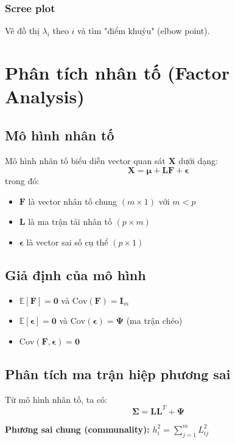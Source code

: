 \subsubsection*{Scree plot}
Vẽ đồ thị $\lambda_i$ theo $i$ và tìm "điểm khuỷu" (elbow point).

\section{Phân tích nhân tố (Factor Analysis)}

\subsection{Mô hình nhân tố}
\begin{dn}
Mô hình nhân tố biểu diễn vector quan sát $\mathbf{X}$ dưới dạng:
\[
\mathbf{X} = \boldsymbol{\mu} + \mathbf{L}\mathbf{F} + \boldsymbol{\epsilon}
\]
trong đó:
\begin{itemize}
    \item $\mathbf{F}$ là vector nhân tố chung $(m \times 1)$ với $m < p$
    \item $\mathbf{L}$ là ma trận tải nhân tố $(p \times m)$
    \item $\boldsymbol{\epsilon}$ là vector sai số cụ thể $(p \times 1)$
\end{itemize}
\end{dn}

\subsection{Giả định của mô hình}
\begin{itemize}
    \item $\mathbb{E}[\mathbf{F}] = \mathbf{0}$ và $\text{Cov}(\mathbf{F}) = \mathbf{I}_m$
    \item $\mathbb{E}[\boldsymbol{\epsilon}] = \mathbf{0}$ và $\text{Cov}(\boldsymbol{\epsilon}) = \boldsymbol{\Psi}$ (ma trận chéo)
    \item $\text{Cov}(\mathbf{F}, \boldsymbol{\epsilon}) = \mathbf{0}$
\end{itemize}

\subsection{Phân tích ma trận hiệp phương sai}
Từ mô hình nhân tố, ta có:
\[
\boldsymbol{\Sigma} = \mathbf{L}\mathbf{L}^T + \boldsymbol{\Psi}
\]

\textbf{Phương sai chung (communality):} $h_i^2 = \sum_{j=1}^m L_{ij}^2$

